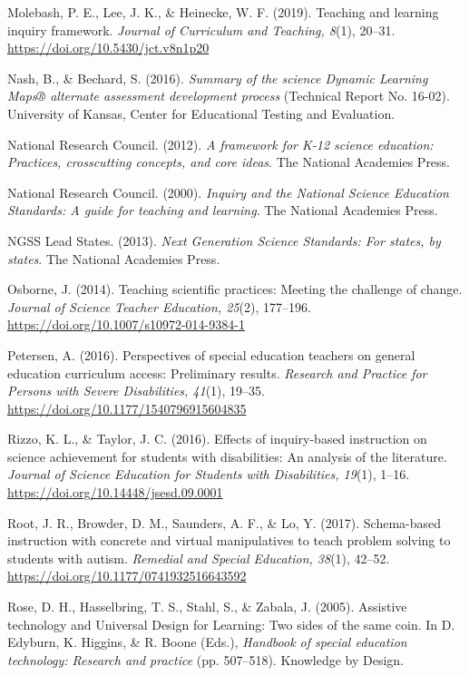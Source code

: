 \documentclass[11.5pt]{sig-alternate} %
\begin{document}
Molebash, P. E., Lee, J. K., \& Heinecke, W. F. (2019). Teaching and learning inquiry framework. \textit{Journal of Curriculum and Teaching, 8}(1), 20–31. \url{https://doi.org/10.5430/jct.v8n1p20}

Nash, B., \& Bechard, S. (2016). \textit{Summary of the science Dynamic Learning Maps® alternate assessment development process} (Technical Report No. 16-02). University of Kansas, Center for Educational Testing and Evaluation.

National Research Council. (2012). \textit{A framework for K-12 science education: Practices, crosscutting concepts, and core ideas}. The National Academies Press.

National Research Council. (2000). \textit{Inquiry and the National Science Education Standards: A guide for teaching and learning}. The National Academies Press.

NGSS Lead States. (2013). \textit{Next Generation Science Standards: For states, by states}. The National Academies Press.

Osborne, J. (2014). Teaching scientific practices: Meeting the challenge of change. \textit{Journal of Science Teacher Education, 25}(2), 177–196. \url{https://doi.org/10.1007/s10972-014-9384-1}

Petersen, A. (2016). Perspectives of special education teachers on general education curriculum access: Preliminary results. \textit{Research and Practice for Persons with Severe Disabilities, 41}(1), 19–35. \url{https://doi.org/10.1177/1540796915604835}

Rizzo, K. L., \& Taylor, J. C. (2016). Effects of inquiry-based instruction on science achievement for students with disabilities: An analysis of the literature. \textit{Journal of Science Education for Students with Disabilities, 19}(1), 1–16. \url{https://doi.org/10.14448/jsesd.09.0001}

Root, J. R., Browder, D. M., Saunders, A. F., \& Lo, Y. (2017). Schema-based instruction with concrete and virtual manipulatives to teach problem solving to students with autism. \textit{Remedial and Special Education, 38}(1), 42–52. \url{https://doi.org/10.1177/0741932516643592}

Rose, D. H., Hasselbring, T. S., Stahl, S., \& Zabala, J. (2005). Assistive technology and Universal Design for Learning: Two sides of the same coin. In D. Edyburn, K. Higgins, \& R. Boone (Eds.), \textit{Handbook of special education technology: Research and practice} (pp. 507–518). Knowledge by Design.
\end{document}
